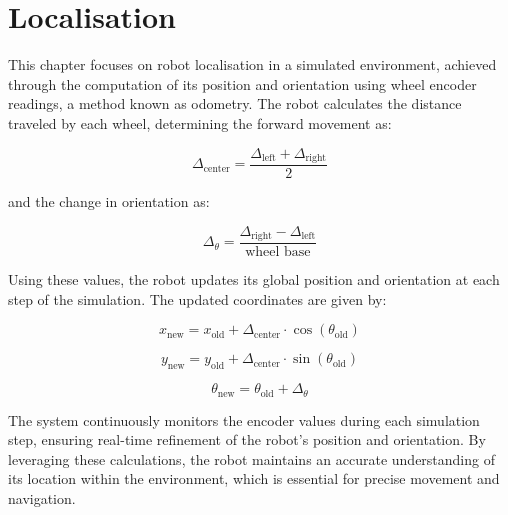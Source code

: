 
\chapter{Localisation}

This chapter focuses on robot localisation in a simulated environment, achieved through the computation of its position and orientation using wheel encoder readings, a method known as odometry. The robot calculates the distance traveled by each wheel, determining the forward movement as:

\[
\Delta_{\text{center}} = \frac{\Delta_{\text{left}} + \Delta_{\text{right}}}{2}
\]

and the change in orientation as:

\[
\Delta_{\theta} = \frac{\Delta_{\text{right}} - \Delta_{\text{left}}}{\text{wheel base}}
\]

Using these values, the robot updates its global position and orientation at each step of the simulation. The updated coordinates are given by:

\[
x_{\text{new}} = x_{\text{old}} + \Delta_{\text{center}} \cdot \cos(\theta_{\text{old}})
\]

\[
y_{\text{new}} = y_{\text{old}} + \Delta_{\text{center}} \cdot \sin(\theta_{\text{old}})
\]

\[
\theta_{\text{new}} = \theta_{\text{old}} + \Delta_{\theta}
\]

The system continuously monitors the encoder values during each simulation step, ensuring real-time refinement of the robot's position and orientation. By leveraging these calculations, the robot maintains an accurate understanding of its location within the environment, which is essential for precise movement and navigation.


